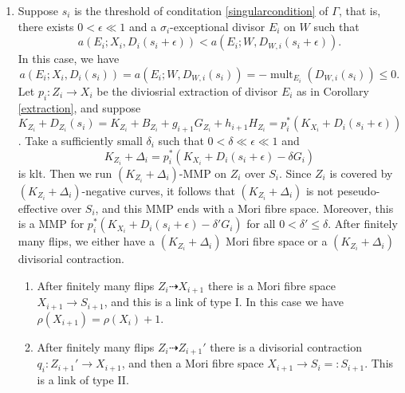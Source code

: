 \documentclass{article}
\begin{document}
\begin{enumerate}
\begin{enumerate}
  \end{enumerate}
\item\label{2b} Suppose $s_{i}$ is the threshold of conditation \ref{singularcondition} of $\Gamma$, that is, there exists  $0<\epsilon \ll 1$ and a $\sigma_{i}$-exceptional divisor $E_{i}$ on $W$ such that 
    \[
      a(E_{i};X_{i},D_{i}(s_{i}+\epsilon))< a(E_{i};W,D_{W,i}(s_{i}+\epsilon))
    .\]
   In this case, we have 
    \[
  a(E_{i};X_{i},D_{i}(s_{i}))= a(E_{i};W,D_{W,i}(s_{i}))=-\operatorname{mult}_{E_{i}}(D_{W,i}(s_{i}))\leqslant 0
    .\]
    Let $p_{i}:Z_{i}\to X_{i}$ be the diviosrial extraction of divisor $E_{i}$ as in Corollary \ref{extraction}, and suppose $K_{Z_{i}}+D_{Z_{i}}(s_{i})=K_{Z_{i}}+B_{Z_{i}}+g_{i+1}G_{Z_{i}}+h_{i+1}H_{Z_{i}}=p_{i}^*\left(K_{X_{i}}+D_{i}\left(s_{i}+\epsilon\right)\right)$.
   Take a sufficiently small $\delta_{i}$ such that $0<\delta \ll \epsilon \ll 1$ and
   \[
     K_{Z_{i}}+\Delta_{i}=p_{i}^*(K_{X_{i}}+D_{i}(s_{i}+\epsilon)-\delta G_{i})
   \]
  is klt. Then we run $(K_{Z_{i}}+\Delta_{i})$-MMP on $Z_{i}$ over $S_{i}$. Since $Z_{i}$ is covered by $(K_{Z_{i}}+\Delta_{i})$-negative curves, it follows that $(K_{Z_{i}}+\Delta_{i})$ is not peseudo-effective over $S_{i}$, and  this MMP ends with a Mori fibre space. Moreover, this is a MMP for $p_{i}^*(K_{X_{i}}+D_{i}(s_{i}+\epsilon)-\delta'G_{i})$ for all $0<\delta'\leqslant\delta$. After finitely many flips, we either have a $(K_{Z_{i}}+\Delta_{i})$ Mori fibre space or a $(K_{Z_{i}}+\Delta_{i})$ divisorial contraction.
  \begin{enumerate}
    \item\label{2b1} After finitely many flips $Z_{i}\dashrightarrow X_{i+1}$ there is a Mori fibre space $X_{i+1}\to S_{i+1}$, and this is a link of type I. In this case we have $\rho(X_{i+1})=\rho(X_{i})+1$.
    \item\label{2b2} After finitely many flips $Z_{i}\dashrightarrow Z_{i+1}'$ there is a divisorial contraction $q_{i}:Z_{i+1}'\to X_{i+1}$, and then a Mori fibre space $X_{i+1}\to S_{i}=:S_{i+1}$. This is a link of type II.   \end{enumerate}
\end{enumerate}
\end{document}
